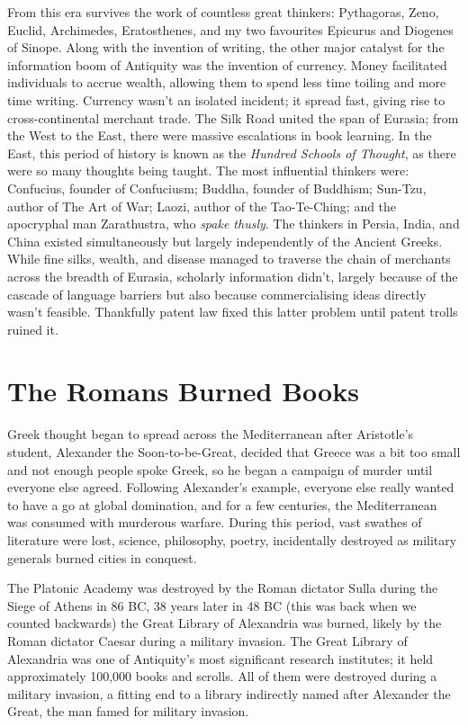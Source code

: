 From this era survives the work of countless great thinkers: Pythagoras, Zeno, Euclid, Archimedes, Eratosthenes, and my two favourites Epicurus and Diogenes of Sinope. Along with the invention of writing, the other major catalyst for the information boom of Antiquity was the invention of currency. Money facilitated individuals to accrue wealth, allowing them to spend less time toiling and more time writing. Currency wasn't an isolated incident; it spread fast, giving rise to cross-continental merchant trade. The Silk Road united the span of Eurasia; from the West to the East, there were massive escalations in book learning. In the East, this period of history is known as the \textit{Hundred Schools of Thought}, as there were so many thoughts being taught. The most influential thinkers were: Confucius, founder of Confuciusm; Buddha, founder of Buddhism; Sun-Tzu, author of The Art of War; Laozi, author of the Tao-Te-Ching; and the apocryphal man Zarathustra, who \textit{spake thusly}. The thinkers in Persia, India, and China existed simultaneously but largely independently of the Ancient Greeks. While fine silks, wealth, and disease managed to traverse the chain of merchants across the breadth of Eurasia, scholarly information didn't, largely because of the cascade of language barriers but also because commercialising ideas directly wasn't feasible. Thankfully patent law fixed this latter problem until patent trolls ruined it.

\section{The Romans Burned Books}

Greek thought began to spread across the Mediterranean after Aristotle's student, Alexander the Soon-to-be-Great, decided that Greece was a bit too small and not enough people spoke Greek, so he began a campaign of murder until everyone else agreed. Following Alexander's example, everyone else really wanted to have a go at global domination, and for a few centuries, the Mediterranean was consumed with murderous warfare. During this period, vast swathes of literature were lost, science, philosophy, poetry, incidentally destroyed as military generals burned cities in conquest. 

The Platonic Academy was destroyed by the Roman dictator Sulla during the Siege of Athens in 86 BC, 38 years later in 48 BC (this was back when we counted backwards) the Great Library of Alexandria was burned, likely by the Roman dictator Caesar during a military invasion. The Great Library of Alexandria was one of Antiquity's most significant research institutes; it held approximately 100,000 books and scrolls. All of them were destroyed during a military invasion, a fitting end to a library indirectly named after Alexander the Great, the man famed for military invasion.

